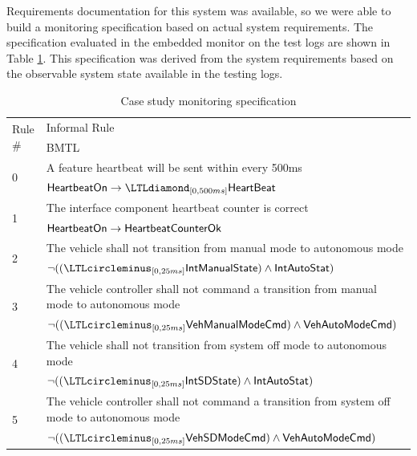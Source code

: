 Requirements documentation for this system was available, so we were able to build a monitoring specification based on actual system requirements.
The specification evaluated in the embedded monitor on the test logs are shown in Table \ref{tab:monspec}. This specification was derived from the system requirements based on the observable system state available in the testing logs. 



\begin{table}[t]
\begin{tabular}{|l|p{4.5in}|}
\hline \multirow{2}{*}{Rule \#} & Informal Rule \\ & BMTL \\
\hline \multirow{2}{*}{0} & A feature heartbeat will be sent within every 500ms \\
& $\pred{HeartbeatOn} \rightarrow \LTLdiamond_{[0,500ms]} \pred{HeartBeat}$ \\
\hline \multirow{2}{*}{1} & The interface component heartbeat counter is correct \\
& $\mathsf{HeartbeatOn} \rightarrow \mathsf{HeartbeatCounterOk}$ \\
\hline \multirow{2}{*}{2} & The vehicle shall not transition from manual mode to autonomous mode \\
&  $\neg ((\LTLcircleminus_{[0,25ms]} \pred{IntManualState}) \wedge \pred{IntAutoStat})$\\
\hline \multirow{2}{*}{3} & The vehicle controller shall not command a transition from manual mode to autonomous mode \\
& $\neg ((\LTLcircleminus_{[0,25ms]} \pred{VehManualModeCmd}) \wedge \pred{VehAutoModeCmd})$\\
\hline \multirow{2}{*}{4} & The vehicle shall not transition from system off mode to autonomous mode \\ 
&  $\neg ((\LTLcircleminus_{[0,25ms]} \pred{IntSDState}) \wedge \pred{IntAutoStat})$\\
\hline \multirow{2}{*}{5} & The vehicle controller shall not command a transition from system off mode to autonomous mode \\
& $\neg ((\LTLcircleminus_{[0,25ms]} \pred{VehSDModeCmd}) \wedge \pred{VehAutoModeCmd})$\\
\hline
\end{tabular}
\caption{Case study monitoring specification \label{tab:monspec}}
\end{table}

